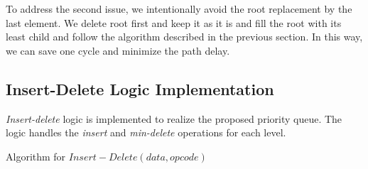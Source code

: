 \documentclass[10pt, conference, compsocconf]{IEEEtran}
\begin{document}
To address the second issue, we intentionally avoid the root replacement by the last element.
We delete root first and keep it as it is and fill the root with its least child and follow the algorithm described in the previous section.
In this way, we can save one cycle and minimize the path delay.

\subsection{Insert-Delete Logic Implementation}

{\it Insert-delete} logic is implemented to realize the proposed priority queue.
The logic handles the {\it insert} and {\it min-delete} operations for each level.

\begin{algorithm}
\label{algo1}
        \caption{Algorithm for $Insert-Delete (data, opcode)$}
\label{algo1}
        \begin{algorithmic}[1]
            \ENDIF
                \ENDIF
            \ENDFOR
          \ELSE
            \ELSE

            \ENDIF

          \ENDWHILE
        \ENDIF

        \end{algorithmic}
\end{algorithm}
\end{document}

